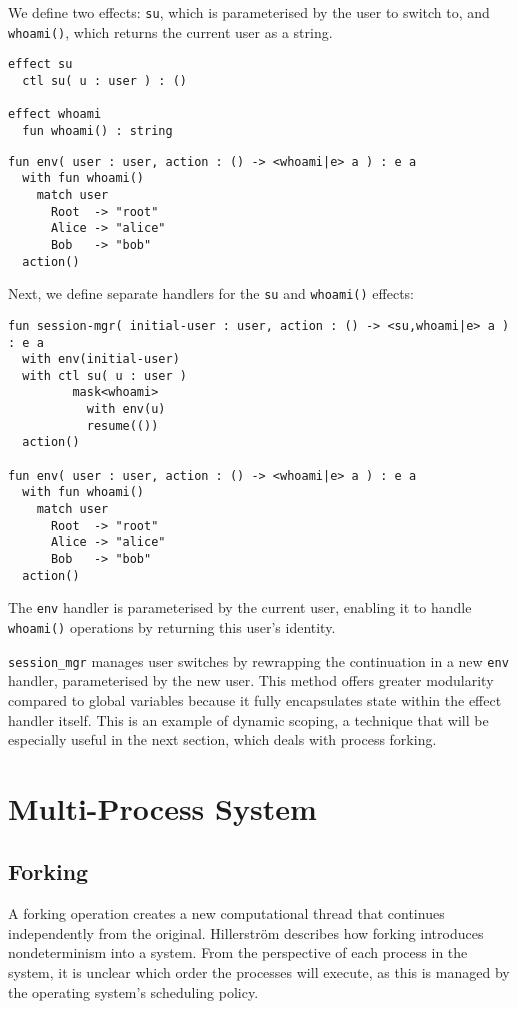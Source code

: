 \documentclass[logo,bsc,singlespacing,parskip]{infthesis}
\begin{document}
We define two effects: \lstinline{su}, which is parameterised by the user to switch to, and \lstinline{whoami()}, which returns the current user as a string.

\begin{lstlisting}
effect su
  ctl su( u : user ) : ()

effect whoami
  fun whoami() : string
\end{lstlisting}


\begin{lstlisting}
fun env( user : user, action : () -> <whoami|e> a ) : e a
  with fun whoami() 
    match user
      Root  -> "root"
      Alice -> "alice"
      Bob   -> "bob"
  action()
\end{lstlisting}

Next, we define separate handlers for the \lstinline{su} and \lstinline{whoami()} effects:
\begin{lstlisting}
fun session-mgr( initial-user : user, action : () -> <su,whoami|e> a ) : e a
  with env(initial-user)
  with ctl su( u : user )
         mask<whoami>
           with env(u)
           resume(())
  action()

fun env( user : user, action : () -> <whoami|e> a ) : e a
  with fun whoami() 
    match user
      Root  -> "root"
      Alice -> "alice"
      Bob   -> "bob"
  action()
\end{lstlisting}

The \lstinline{env} handler is parameterised by the current user, enabling it to handle \lstinline{whoami()} operations by returning this user's identity.

\lstinline{session_mgr} manages user switches by rewrapping the continuation in a new \lstinline{env} handler, parameterised by the new user. This method offers greater modularity compared to global variables because it fully encapsulates state within the effect handler itself. This is an example of dynamic scoping, a technique that will be especially useful in the next section, which deals with process forking.

\section{Multi-Process System}
\subsection{Forking}
A forking operation creates a new computational thread that continues independently from the original. Hillerström describes how forking introduces nondeterminism into a system.  From the perspective of each process in the system, it is unclear which order the processes will execute, as this is managed by the operating system's scheduling policy. 
\end{document}
